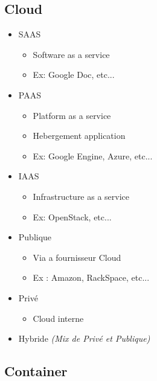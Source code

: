 \documentclass[a4paper]{article}
\begin{document}
    \subsection{Cloud}
    \begin{itemize}
      \item SAAS
      \begin{itemize}
        \item Software as a service
        \item Ex: Google Doc, etc...
      \end{itemize}
      \item PAAS 
      \begin{itemize}
        \item Platform as a service
        \item Hebergement application
        \item Ex: Google Engine, Azure, etc...
      \end{itemize}
      \item IAAS 
      \begin{itemize}
        \item Infrastructure as a service
        \item Ex: OpenStack, etc...
      \end{itemize}
      \item Publique
      \begin{itemize}
        \item Via a fournisseur Cloud
        \item Ex : Amazon, RackSpace, etc...
      \end{itemize}
      \item Privé
      \begin{itemize}
        \item Cloud interne
      \end{itemize}
      \item Hybride \emph{(Mix de Privé et Publique)}
    \end{itemize}

    \subsection{Container}
\end{document}
